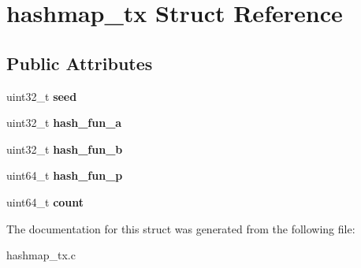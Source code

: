 \hypertarget{structhashmap__tx}{}\section{hashmap\+\_\+tx Struct Reference}
\label{structhashmap__tx}
\subsection*{Public Attributes}
\begin{DoxyCompactItemize}
\item 
uint32\+\_\+t {\bfseries seed}\hypertarget{structhashmap__tx_a3a3693aa60920c724a0f4511b18a6fd2}{}\label{structhashmap__tx_a3a3693aa60920c724a0f4511b18a6fd2}

\item 
uint32\+\_\+t {\bfseries hash\+\_\+fun\+\_\+a}\hypertarget{structhashmap__tx_aff7708436836d0ae87500fa876dfcecf}{}\label{structhashmap__tx_aff7708436836d0ae87500fa876dfcecf}

\item 
uint32\+\_\+t {\bfseries hash\+\_\+fun\+\_\+b}\hypertarget{structhashmap__tx_a9f6c8ffb7a4f3472edb7afeb99e45074}{}\label{structhashmap__tx_a9f6c8ffb7a4f3472edb7afeb99e45074}

\item 
uint64\+\_\+t {\bfseries hash\+\_\+fun\+\_\+p}\hypertarget{structhashmap__tx_adc5b9769a040542bda4f25e3098f2837}{}\label{structhashmap__tx_adc5b9769a040542bda4f25e3098f2837}

\item 
uint64\+\_\+t {\bfseries count}\hypertarget{structhashmap__tx_a70fbb5e277e0e52c199c1024cfbd08c1}{}\label{structhashmap__tx_a70fbb5e277e0e52c199c1024cfbd08c1}

\end{DoxyCompactItemize}


The documentation for this struct was generated from the following file\+:\begin{DoxyCompactItemize}
\item 
hashmap\+\_\+tx.\+c\end{DoxyCompactItemize}
